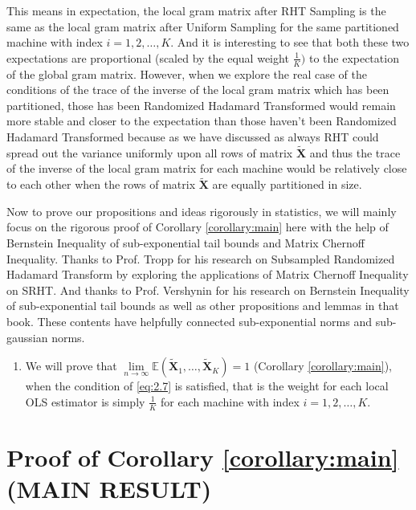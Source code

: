 \documentclass[11pt]{article}
\numberwithin{equation}{section}
\theoremstyle{plain}
\theoremstyle{definition}
\theoremstyle{remark}
\begin{document}
This means in expectation, the local gram matrix after RHT Sampling is the same as the local gram matrix after Uniform Sampling for the same partitioned machine with index $i = 1,2,\ldots,K$.
And it is interesting to see that both these two expectations are proportional (scaled by the equal weight $\frac{1}{K})$ to the expectation of the global gram matrix.
However, when we explore the real case of the conditions of the trace of the inverse of the local gram matrix which has been partitioned, those has been Randomized Hadamard Transformed would remain more stable and closer to the expectation than those haven't been Randomized Hadamard Transformed
because as we have discussed as always RHT could spread out the variance uniformly upon all rows of matrix $\mathbf{\tilde{X}}$ and thus
the trace of the inverse of the local gram matrix for each machine would be relatively close to each other when the rows of matrix $\mathbf{\tilde{X}}$ are equally partitioned in size.

Now to prove our propositions and ideas rigorously in statistics, we will mainly focus on the rigorous proof of Corollary \ref{corollary:main} here with the help of Bernstein Inequality of sub-exponential tail bounds and Matrix Chernoff Inequality.
Thanks to Prof. Tropp for his research on Subsampled Randomized Hadamard Transform by exploring the applications of Matrix Chernoff Inequality on SRHT.\cite{tropp2011improvedanalysissubsampledrandomized} And thanks to Prof. Vershynin for his research on Bernstein Inequality of sub-exponential tail bounds\cite{vershynin2018high} as well as other propositions and lemmas in that book.
These contents have helpfully connected sub-exponential norms and sub-gaussian norms.

\begin{enumerate}
\item We will prove that $\lim\limits_{n\to\infty}\mathbb{E}(\tilde{\mathbf{X}}_1,\ldots,\tilde{\mathbf{X}}_K) = 1$ (Corollary \ref{corollary:main}), when the condition of \ref{eq:2.7} is satisfied, that is the weight for each local OLS estimator is simply $\frac{1}{K}$ for each machine with index $i = 1,2,\ldots,K$.

\end{enumerate}
\section{Proof of Corollary \ref{corollary:main} (MAIN RESULT)}
\end{document}
